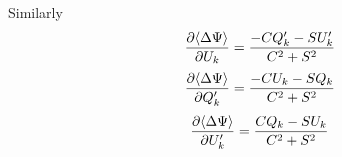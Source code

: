 \documentclass[12pt]{article}
\begin{document}
Similarly
\begin{equation}
{\partial\langle\Delta\Psi\rangle\over\partial U_k} 
= { -C Q^\prime_k - S U^\prime_k \over C^2 + S^2 }
\end{equation}
\begin{equation}
{\partial\langle\Delta\Psi\rangle\over\partial Q^\prime_k} 
= { -C U_k - S Q_k \over C^2 + S^2 }
\end{equation}
\begin{equation}
{\partial\langle\Delta\Psi\rangle\over\partial U^\prime_k} 
= { C Q_k - S U_k \over C^2 + S^2 }
\end{equation}
\end{document}
